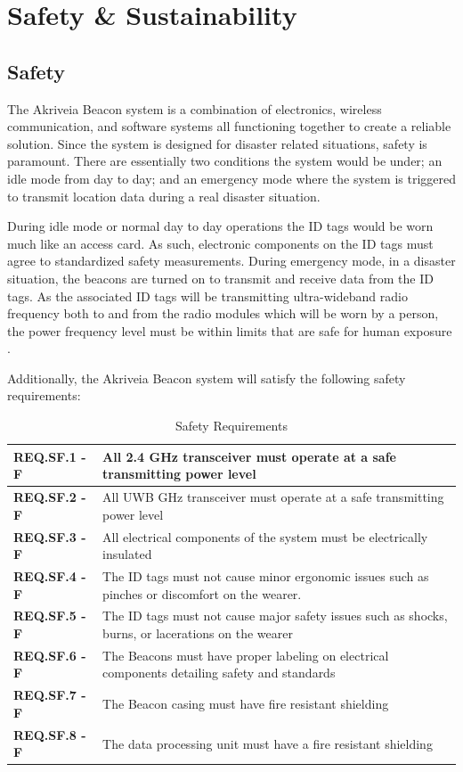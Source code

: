 

 \setcounter{section}{4}
\section{Safety \& Sustainability}
\bigskip
\subsection{Safety}
\medskip
The Akriveia Beacon system is a combination of electronics, wireless communication, and software systems all functioning together to create a reliable solution. Since the system is designed for disaster related situations, safety is paramount. There are essentially two conditions the system would be under; an idle mode from day to day; and an emergency mode where the system is triggered to transmit location data during a real disaster situation.

\bigskip
During idle mode or normal day to day operations the ID tags would be worn much like an access card. As such, electronic components on the ID tags must agree to standardized safety measurements. During emergency mode, in a disaster situation, the beacons are turned on to transmit and receive data from the ID tags. As the associated ID tags will be transmitting ultra-wideband radio frequency both to and from the radio modules which will be worn by a person, the power frequency level must be within limits that are safe for human exposure \cite{R22}.
 
\bigskip
Additionally, the Akriveia Beacon system will satisfy the following safety requirements:

\bgroup
\def\arraystretch{1.5}
\begin{table}[H]
\centering
\begin{tabular}{ | m{3cm} | m{13cm}| } 
\hline
\textbf{REQ.SF.1 - F} & All 2.4 GHz transceiver must operate at a safe transmitting power level\\
\hline
\textbf{REQ.SF.2 - F} &  All UWB GHz transceiver must operate at a safe transmitting power level\\
\hline
\textbf{REQ.SF.3 - F} & All electrical components of the system must be electrically insulated \\
\hline
\textbf{REQ.SF.4 - F} & The ID tags must not cause minor ergonomic issues such as pinches or discomfort on the wearer.\\
\hline
\textbf{REQ.SF.5 - F} & The ID tags must not cause major safety issues such as shocks, burns, or lacerations on the wearer\\
\hline
\textbf{REQ.SF.6 - F} & The Beacons must have proper labeling on electrical components detailing safety and standards \\
\hline
\textbf{REQ.SF.7 - F} & The Beacon casing must have fire resistant shielding \\
\hline
\textbf{REQ.SF.8 - F} & The data processing unit must have a fire resistant shielding \\
\hline
\end{tabular}
\caption{Safety Requirements}
\end{table}	

